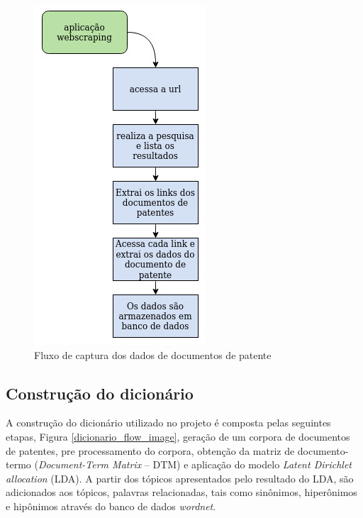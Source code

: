 \begin{figure}[ht!]
	\centering
	\includegraphics[scale=0.5]{imagens/tcc_webscraping.jpg}
	\caption{Fluxo de captura dos dados de documentos de patente 
			 \label{webscraping_flow_image}}
\end{figure}


\subsection{Construção do dicionário}
A construção do dicionário utilizado no projeto é composta pelas seguintes etapas, Figura \ref{dicionario_flow_image}, geração de um corpora de documentos de patentes, pre processamento do corpora, obtenção da matriz de documento-termo (\textit{Document-Term Matrix} – DTM) e aplicação do modelo \textit{Latent Dirichlet allocation} (LDA). A partir dos tópicos apresentados pelo resultado do LDA, são adicionados aos tópicos, palavras relacionadas, tais como sinônimos, hiperônimos e hipônimos através do banco de dados \textit{wordnet}.


